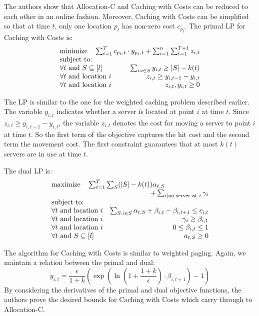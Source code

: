 The authors show that Allocation-C and Caching with Costs can be reduced to each other in an online fashion.
Moreover, Caching with Costs can be simplified so that at time $t$, only one location $p_t$ has non-zero cost $c_{p_t}$.
The primal LP for Caching with Costs is:
\[
\begin{array}{lr}
  \multicolumn{2}{l}{\textrm{minimize} \quad  \sum_{t=1}^T c_{p_t, t} \cdot y_{p_t,t} + \sum_{i=1}^n\sum_{t=1}^{T+1} z_{i,t}} \\
  \textrm{subject to:} & \\
  \forall t \textrm{ and } S \subseteq [l] & \sum_{i : i \in S} y_{i,t} \geq |S| - k(t) \\
  \forall t \textrm { and location } i & z_{i,t} \geq y_{i,t-1} - y_{i,t} \\
  \forall t \textrm { and location } i & z_{i,t}, y_{i,t} \geq 0 \\
\end{array}
\]

The LP is similar to the one for the weighted caching problem described earlier.
The variable $y_{i,t}$ indicates whether a server is located at point $i$ at time $t$.
Since $z_{i,t} \geq y_{i,t-1} - y_{i,t}$, the variable $z_{i,t}$ denotes the cost for moving a server to point $i$ at time $t$.
So the first term of the objective captures the hit cost and the second term the movement cost.
The first constraint guarantees that at most $k(t)$ servers are in use at time $t$.

The dual LP is:
\[
\begin{array}{lr}
  \multicolumn{2}{l}{\textrm{maximize} \quad  \sum_{t=1}^T\sum_S (|S| - k(t)) \alpha_{t,S}} \\
  \multicolumn{2}{r}{ + \sum_{i | \textrm{no server at }i} \gamma_i}\\
  \textrm{subject to:} & \\
  \forall t \textrm { and location } i & \sum_{S: i\in S} \alpha_{t,S} + \beta_{i,t} - \beta_{i,t+1} \leq c_{i,t}\\
  \forall t \textrm { and location } i & \gamma_i \geq \beta_{i, 1} \\
  \forall t \textrm { and location } i & 0 \leq \beta_{i, t} \leq 1\\
  \forall t \textrm { and } S \subseteq [l]  & a_{t,S} \geq 0\\
\end{array}
\]


The algorithm for Caching with Costs is similar to weighted paging.
Again, we maintain a relation between the primal and dual:
\[
y_{i,t} = \frac{\epsilon}{1 + k} \left( \exp\left( \ln\left( 1 + \frac{1+k}{\epsilon} \right) \cdot \beta_{i, t+1} \right) - 1 \right)
\]
By considering the derivatives of the primal and dual objective functions, the authors prove the desired bounds for Caching with Costs which carry through to Allocation-C.
